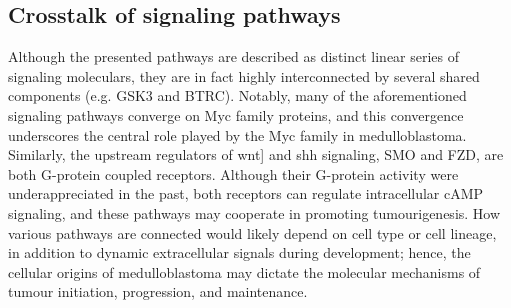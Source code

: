 %
%
%
%
%



\subsection{Crosstalk of signaling pathways}

Although the presented pathways are described as distinct linear series of signaling moleculars, they are in fact highly interconnected by several shared components (e.g. GSK3 and BTRC). Notably, many of the aforementioned signaling pathways converge on Myc family proteins, and this convergence underscores the central role played by the Myc family in medulloblastoma. Similarly, the upstream regulators of \gls{wnt}] and \gls{shh} signaling, SMO and FZD, are both G-protein coupled receptors. Although their G-protein activity were underappreciated in the past, both receptors can regulate intracellular cAMP signaling, and these pathways may cooperate in promoting tumourigenesis. How various pathways are connected would likely depend on cell type or cell lineage, in addition to dynamic extracellular signals during development; hence, the cellular origins of medulloblastoma may dictate the molecular mechanisms of tumour initiation, progression, and maintenance.


